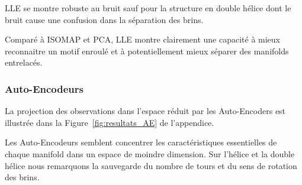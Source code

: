\documentclass[unnumsec,webpdf,modern,large]{projet_manifold}%
\theoremstyle{thmstyleone}%
\theoremstyle{thmstyletwo}%
\theoremstyle{thmstylethree}%
\begin{document}
\begin{table}[htbp]
\centering
\caption{Erreurs de reconstruction LLE (basées sur distances locales entre paires de points)}
\label{tab:lle_errors}
\end{table}

LLE se montre robuste au bruit sauf pour la structure en double hélice dont le bruit cause une confusion dans la séparation des brins.

Comparé à ISOMAP et PCA, LLE montre clairement une capacité à mieux reconnaitre un motif enroulé et à potentiellement mieux séparer des manifolds entrelacés.


\subsubsection{Auto-Encodeurs}

La projection des observations dans l'espace réduit par les Auto-Encoders est illustrée dans la Figure~\ref{fig:resultats_AE} de l'appendice.


Les Auto-Encodeurs semblent concentrer les caractéristiques essentielles de chaque manifold dans un espace de moindre dimension. Sur l'hélice et la double hélice nous remarquons la sauvegarde du nombre de tours et du sens de rotation des brins.

\begin{table}[htbp]
\centering
\caption{Erreurs de reconstruction des Auto-Encodeurs, MSE (entre originaux et reconstruits à partir de l'encodage)}
\label{tab:ae_errors}
\end{table}
\end{document}
